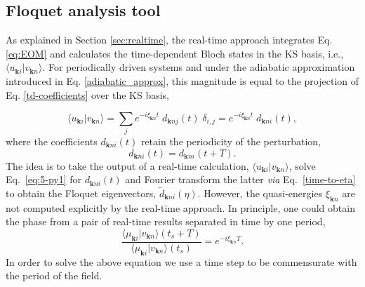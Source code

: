 \documentclass[aps,physrev,preprint,groupedaddress]{revtex4-2}
\newcommand{\kpt}{\mathbf{k}}
\newcommand{\tdKS}{|v_{\mathbf{k}n}\rangle}
\newcommand{\dFKS}{\widetilde{d}_{\kpt ni}(\eta) }
\renewcommand{\[}{\left[}
\renewcommand{\]}{\right]}
\renewcommand{\(}{\left(}
\renewcommand{\)}{\right)}
\begin{document}

\subsection{\label{sec:FloqAn} Floquet analysis tool}
As explained in Section \ref{sec:realtime}, the real-time approach integrates Eq. \ref{eq:EOM} and calculates the time-dependent Bloch states in the KS basis, i.e., $\langle u_{\mathbf{k}i}\tdKS$. For periodically driven systems and under the adiabatic approximation introduced in Eq. \ref{adiabatic_approx}, this magnitude is equal to the projection of Eq. \ref{td-coefficients} over the KS basis,

\begin{equation}
     \label{eq:5-py1}
     \langle u_{\mathbf{k}i} \tdKS  = \sum_{j}{e^{-i\xi_{\kpt n} t} \; d_{\kpt nj}(t)\;\delta_{i,j}} = e^{-i\xi_{\kpt n} t} \; d_{\kpt ni}(t) ,
\end{equation}
where the coefficients $d_{\kpt ni}(t)$ retain the periodicity of the perturbation,
\begin{equation}\label{eq:5-py1b}
    d_{\kpt ni}(t)=d_{\kpt ni}(t+T).
\end{equation}
The idea is to take the output of a real-time calculation, $\langle u_{\mathbf{k}i} \tdKS$, solve Eq.~\ref{eq:5-py1} for $d_{\kpt ni}(t)$ and Fourier transform the latter \textit{via} Eq.~\ref{time-to-eta} to obtain the Floquet eigenvectors, $\dFKS$. However, the quasi-energies $\xi_{\kpt n}$ are not computed explicitly by the real-time approach. In principle, one could obtain the phase from a pair of real-time results separated in time by one period,
\begin{equation}
     \label{eq:5-py2}
     \frac{\langle \mu_{\mathbf{k}i} \tdKS(t_s+T)}{\langle \mu_{\mathbf{k}i} \tdKS(t_s)} = e^{-i\xi_{\kpt n} T}.
\end{equation}
In order to solve the above equation we use a  time step to be commensurate with the period of the field.


\end{document}
